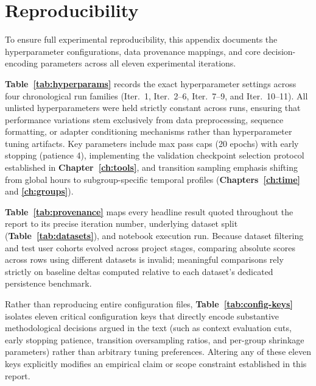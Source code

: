\chapter{Reproducibility}
\label{app:repro}

To ensure full experimental reproducibility, this appendix documents the hyperparameter configurations, data provenance mappings, and core decision-encoding parameters across all eleven experimental iterations. 

\textbf{Table~\ref{tab:hyperparams}} records the exact hyperparameter settings across four chronological run families (Iter.\ 1, Iter.\ 2--6, Iter.\ 7--9, and Iter.\ 10--11). All unlisted hyperparameters were held strictly constant across runs, ensuring that performance variations stem exclusively from data preprocessing, sequence formatting, or adapter conditioning mechanisms rather than hyperparameter tuning artifacts. Key parameters include max pass caps (20 epochs) with early stopping (patience 4), implementing the validation checkpoint selection protocol established in \textbf{Chapter~\ref{ch:tools}}, and transition sampling emphasis shifting from global hours to subgroup-specific temporal profiles (\textbf{Chapters~\ref{ch:time}} and \textbf{\ref{ch:groups}}).

\bigskip


\bigskip
\textbf{Table~\ref{tab:provenance}} maps every headline result quoted throughout the report to its precise iteration number, underlying dataset split (\textbf{Table~\ref{tab:datasets}}), and notebook execution run. Because dataset filtering and test user cohorts evolved across project stages, comparing absolute scores across rows using different datasets is invalid; meaningful comparisons rely strictly on baseline deltas computed relative to each dataset's dedicated persistence benchmark.

\bigskip


\bigskip
Rather than reproducing entire configuration files, \textbf{Table~\ref{tab:config-keys}} isolates eleven critical configuration keys that directly encode substantive methodological decisions argued in the text (such as context evaluation cuts, early stopping patience, transition oversampling ratios, and per-group shrinkage parameters) rather than arbitrary tuning preferences. Altering any of these eleven keys explicitly modifies an empirical claim or scope constraint established in this report.

